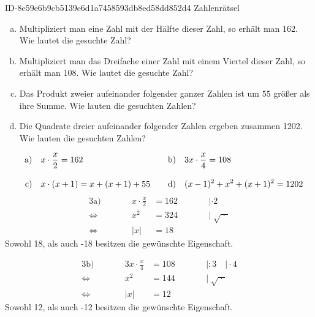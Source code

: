 \begin{exercise}
      {ID-8e59e6b9cb5139e6d1a7458593db8ed58dd852d4}
      {Zahlenrätsel}
  \ifproblem\problem
    \begin{enumerate}[a)]
      \item Multipliziert man eine Zahl mit der Hälfte dieser Zahl, so erhält man
            $162$. Wie lautet die gesuchte Zahl?
      \item Multipliziert man das Dreifache einer Zahl mit einem Viertel dieser
            Zahl, so erhält man $108$. Wie lautet die gesuchte Zahl?
      \item Das Produkt zweier aufeinander folgender ganzer Zahlen ist um $55$ größer
            als ihre Summe. Wie lauten die gesuchten Zahlen?
      \item Die Quadrate dreier aufeinander folgender Zahlen ergeben zusammen
            \num{1202}. Wie lauten die gesuchten Zahlen?
    \end{enumerate}
  \fi
  \ifoutline\outline
    \newcommand{\exnum}[1]{\text{\makebox[2em][r]{#1}}&\quad}
    \begin{align*}
      \exnum{a)}x\cdot\frac{x}{2}=162  & \exnum{b)}3x\cdot\frac{x}{4}=108 \\[2ex]
      \exnum{c)}x\cdot(x+1)=x+(x+1)+55 & \exnum{d)}(x-1)^2+x^2+(x+1)^2=1202
    \end{align*}
  \fi
  \ifoutcome\outcome
    \small
    \begin{alignat*}{3}
            \text{a)}&\qquad & x\cdot\frac{x}{2}&=162 & \qquad&|\cdot2             \\[2ex]
      \Leftrightarrow&\qquad &               x^2&=324 & \qquad&|\;\sqrt{\;\cdot\;} \\[2ex]
      \Leftrightarrow&\qquad &      \vert x\vert&=18  & \qquad&
    \end{alignat*}
    Sowohl 18, als auch -18 besitzen die gewünschte Eigenschaft.

    \begin{alignat*}{3}
            \text{b)}&\qquad &   3x\cdot\frac{x}{4}&=108   & \qquad&|:3\quad|\cdot4     \\[2ex]
      \Leftrightarrow&\qquad &                  x^2&=144   & \qquad&|\;\sqrt{\;\cdot\;} \\[2ex]
      \Leftrightarrow&\qquad &         \vert x\vert&=12    & \qquad&
    \end{alignat*}
    Sowohl 12, als auch -12 besitzen die gewünschte Eigenschaft.


\end{exercise}
